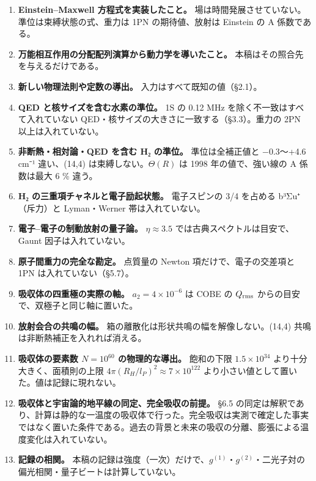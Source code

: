 \documentclass[
  a4paper,
]{ltjsarticle}
\providecommand{\tightlist}{%
  \setlength{\itemsep}{0pt}\setlength{\parskip}{0pt}}
\begin{document}
\begin{enumerate}
\def\labelenumi{\arabic{enumi}.}
\tightlist
\item
  \textbf{Einstein--Maxwell 方程式を実装したこと。}
  場は時間発展させていない。準位は束縛状態の式、重力は 1PN
  の期待値、放射は Einstein の A 係数である。
\item
  \textbf{万能相互作用の分配配列演算から動力学を導いたこと。}
  本稿はその照合先を与えるだけである。
\item
  \textbf{新しい物理法則や定数の導出。} 入力はすべて既知の値（§2.1）。
\item
  \textbf{QED と核サイズを含む水素の準位。} 1S の 0.12 MHz
  を除く不一致はすべて入れていない
  QED・核サイズの大きさに一致する（§3.3）。重力の 2PN
  以上は入れていない。
\item
  \textbf{非断熱・相対論・QED を含む H₂ の準位。} 準位は全補正値と
  −0.3〜+4.6 cm⁻¹ 違い、(14,4) は束縛しない。\(\Theta(R)\) は 1998
  年の値で、強い線の A 係数は最大 6 \% 違う。
\item
  \textbf{H₂ の三重項チャネルと電子励起状態。} 電子スピンの 3/4 を占める
  b³Σu⁺（斥力）と Lyman・Werner 帯は入れていない。
\item
  \textbf{電子--電子の制動放射の量子論。} \(\eta\approx3.5\)
  では古典スペクトルは目安で、Gaunt 因子は入れていない。
\item
  \textbf{原子間重力の完全な勘定。} 点質量の Newton
  項だけで、電子の交差項と 1PN は入れていない（§5.7）。
\item
  \textbf{吸収体の四重極の実際の軸。} \(a_2=4\times10^{-6}\) は COBE の
  \(Q_{\rm rms}\) からの目安で、双極子と同じ軸に置いた。
\item
  \textbf{放射会合の共鳴の幅。}
  箱の離散化は形状共鳴の幅を解像しない。(14,4)
  共鳴は非断熱補正を入れれば消える。
\item
  \textbf{吸収体の要素数 \(N=10^{60}\) の物理的な導出。} 飽和の下限
  \(1.5\times10^{34}\) より十分大きく、面積則の上限
  \(4\pi(R_H/l_P)^2\approx7\times10^{122}\)
  より小さい値として置いた。値は記録に現れない。
\item
  \textbf{吸収体と宇宙論的地平線の同定、完全吸収の前提。} §6.5
  の同定は解釈であり、計算は静的な一温度の吸収体で行った。完全吸収は実測で確定した事実ではなく置いた条件である。過去の背景と未来の吸収の分離、膨張による温度変化は入れていない。
\item
  \textbf{記録の相関。}
  本稿の記録は強度（一次）だけで、\(g^{(1)}\)・\(g^{(2)}\)・二光子対の偏光相関・量子ビートは計算していない。
\end{enumerate}
\end{document}
